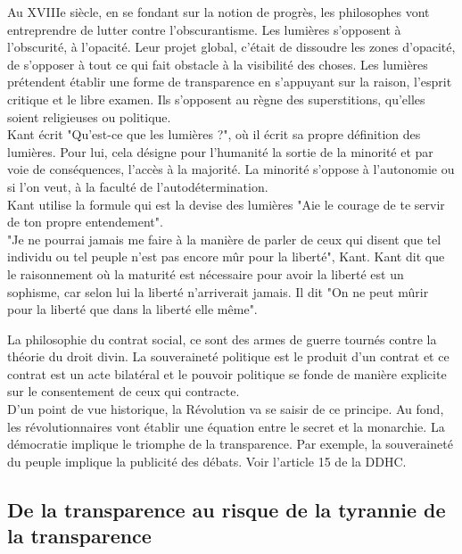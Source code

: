 \documentclass[10pt, a4paper, openany]{book}
\begin{document}
Au XVIIIe siècle, en se fondant sur la notion de progrès, les philosophes vont entreprendre de lutter contre l'obscurantisme. Les lumières s'opposent à l'obscurité, à l'opacité. Leur projet global, c'était de dissoudre les zones d'opacité, de s'opposer à tout ce qui fait obstacle à la visibilité des choses. Les lumières prétendent établir une forme de transparence en s'appuyant sur la raison, l'esprit critique et le libre examen. Ils s'opposent au règne des superstitions, qu'elles soient religieuses ou politique. \\
Kant écrit "Qu'est-ce que les lumières ?", où il écrit sa propre définition des lumières. Pour lui, cela désigne pour l'humanité la sortie de la minorité et par voie de conséquences, l'accès à la majorité. La minorité s'oppose à  l'autonomie ou si l'on veut, à la faculté de l'autodétermination. \\
Kant utilise la formule qui est la devise des lumières "Aie le courage de te servir de ton propre entendement". \\
"Je ne pourrai jamais me faire à la manière de parler de ceux qui disent que tel individu ou tel peuple n'est pas encore mûr pour la liberté", Kant. Kant dit que le raisonnement où la maturité est nécessaire pour avoir la liberté est un sophisme, car selon lui la liberté n'arriverait jamais. Il dit "On ne peut mûrir pour la liberté que dans la liberté elle même". 


La philosophie du contrat social, ce sont des armes de guerre tournés contre la théorie du droit divin. La souveraineté politique est le produit d'un contrat et ce contrat est un acte bilatéral et le pouvoir politique se fonde de manière explicite sur le consentement de ceux qui contracte. \\
D'un point de vue historique, la Révolution va se saisir de ce principe. Au fond, les révolutionnaires vont établir une équation entre le secret et la monarchie. La démocratie implique le triomphe de la transparence. Par exemple, la souveraineté du peuple implique la publicité des débats. Voir l'article 15 de la DDHC. 

\subsection{De la transparence au risque de la tyrannie de la transparence}
\end{document}
